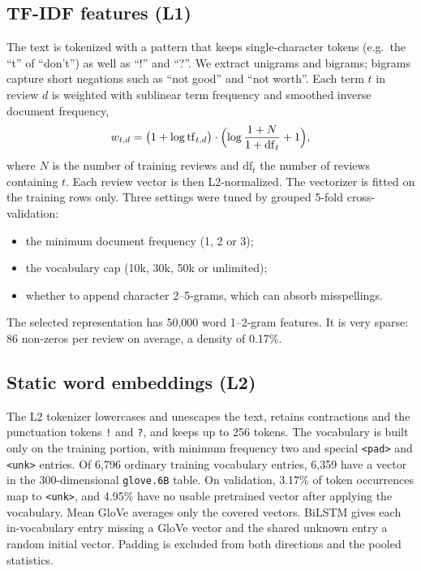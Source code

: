 \subsection{TF-IDF features (L1)}
The text is tokenized with a pattern that keeps single-character tokens (e.g.\ the ``t'' of ``don't'') as well as ``!'' and ``?''.
We extract unigrams and bigrams; bigrams capture short negations such as ``not good'' and ``not worth''.
Each term $t$ in review $d$ is weighted with sublinear term frequency and smoothed inverse document frequency,
\begin{equation}
  w_{t,d} = \bigl(1 + \log \mathrm{tf}_{t,d}\bigr)\cdot\Bigl(\log\frac{1+N}{1+\mathrm{df}_t} + 1\Bigr),
\end{equation}
where $N$ is the number of training reviews and $\mathrm{df}_t$ the number of reviews containing $t$. Each review vector is then L2-normalized.
The vectorizer is fitted on the training rows only.
Three settings were tuned by grouped 5-fold cross-validation:
\begin{itemize}
  \item the minimum document frequency (1, 2 or 3);
  \item the vocabulary cap (10k, 30k, 50k or unlimited);
  \item whether to append character 2--5-grams, which can absorb misspellings.
\end{itemize}
The selected representation has 50{,}000 word 1--2-gram features. It is very sparse: 86 non-zeros per review on average, a density of 0.17\%.

\subsection{Static word embeddings (L2)}
The L2 tokenizer lowercases and unescapes the text, retains contractions and
the punctuation tokens \texttt{!} and \texttt{?}, and keeps up to 256 tokens.
The vocabulary is built only on the training portion, with minimum frequency
two and special \texttt{<pad>} and \texttt{<unk>} entries. Of 6,796 ordinary
training vocabulary entries, 6,359 have a vector in the 300-dimensional
\texttt{glove.6B} table\cite{pennington2014glove}.
On validation, 3.17\% of token occurrences map to \texttt{<unk>}, and
4.95\% have no usable pretrained vector after applying the vocabulary.
Mean GloVe averages only the covered vectors. BiLSTM gives each in-vocabulary
entry missing a GloVe vector and the shared unknown entry a random initial
vector. Padding is excluded from both directions and the pooled statistics.


